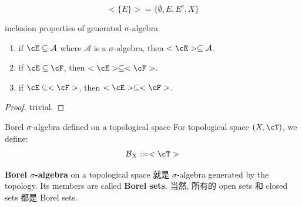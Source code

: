 \documentclass[lang=cn,11pt]{elegantbook}
\begin{document}
\begin{example}
\begin{equation}
    <\{ E\}> = \{ \emptyset, E, E^c, X       \}
\end{equation}
\end{example}


\begin{lemma}{inclusion properties of generated $\sigma$-algebra}
\label{inclusion properties of generated sigma-algebra}
\begin{enumerate}
    \item if $\cE \sub \mathcal{A}$ where $\mathcal{A}$ is a $\sigma$-algebra, then $<\cE> \sub \mathcal{A}$.
    \item if $\cE \sub \cF$, then $<\cE> \sub <\cF>$.
    \item if $\cE \sub <\cF>$, then $<\cE> \sub <\cF>$.
\end{enumerate}
\end{lemma}
\begin{proof}
    trivial.
\end{proof}

\begin{definition}{Borel $\sigma$-algebra defined on a topological space}
For topological space $(X, \cT)$, we define:
$$
\mathcal{B}_X := <\cT>
$$
\end{definition}
\noindent \textbf{Borel $\sigma$-algebra} on a topological space 就是 $\sigma$-algebra generated by the topology. Its members are called \textbf{Borel sets}. 当然, 所有的 open sets 和 closed sets 都是 Borel sets.
\end{document}

